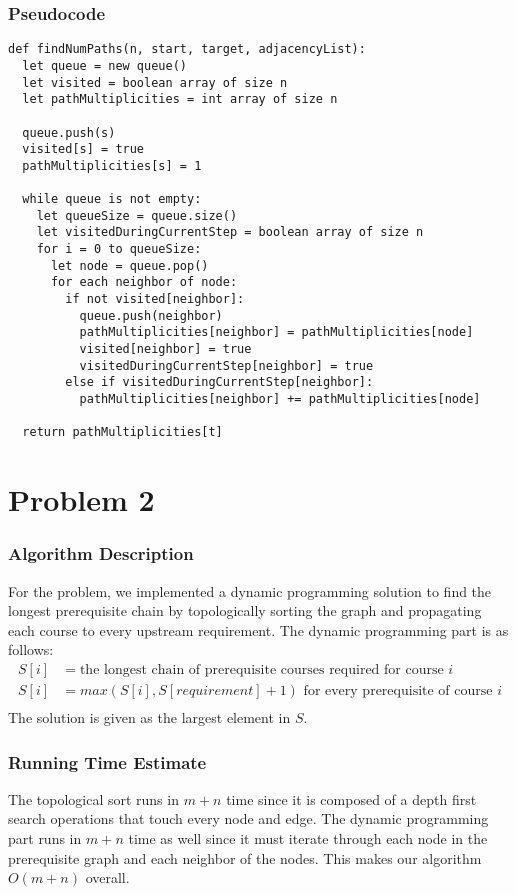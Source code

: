 \documentclass{math}
\begin{document}
\subsubsection*{Pseudocode}
\begin{lstlisting}
def findNumPaths(n, start, target, adjacencyList):
  let queue = new queue()
  let visited = boolean array of size n
  let pathMultiplicities = int array of size n

  queue.push(s)
  visited[s] = true
  pathMultiplicities[s] = 1

  while queue is not empty:
    let queueSize = queue.size()
    let visitedDuringCurrentStep = boolean array of size n
    for i = 0 to queueSize:
      let node = queue.pop()
      for each neighbor of node:
        if not visited[neighbor]:
          queue.push(neighbor)
          pathMultiplicities[neighbor] = pathMultiplicities[node]
          visited[neighbor] = true
          visitedDuringCurrentStep[neighbor] = true
        else if visitedDuringCurrentStep[neighbor]:
          pathMultiplicities[neighbor] += pathMultiplicities[node]

  return pathMultiplicities[t]
\end{lstlisting}

\section*{Problem 2}

\subsubsection*{Algorithm Description}
For the problem, we implemented a dynamic programming solution to find the
longest prerequisite chain by topologically sorting the graph and propagating
each course to every upstream requirement. The dynamic programming part is as
follows:
\begin{align*}
  S[i] &= \text{the longest chain of prerequisite courses required for course }
    i \\
  S[i] &= max(S[i], S[requirement]+1) \text{ for every prerequisite of course }
    i \\
\end{align*}
The solution is given as the largest element in \( S \).

\subsubsection*{Running Time Estimate}
The topological sort runs in \( m+n \) time since it is composed of a depth
first search operations that touch every node and edge. The dynamic
programming part runs in \( m+n \) time as well since it must iterate
through each node in the prerequisite graph and each neighbor of the nodes.
This makes our algorithm \( O(m+n) \) overall.
\end{document}
